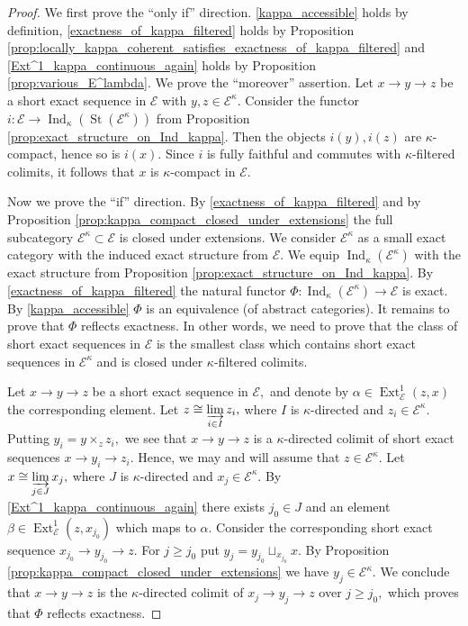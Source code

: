\documentclass[11pt,leqno]{amsart}
\numberwithin{equation}{section}
\newcommand{\indlim}[1][]{\mathop{\varinjlim}\limits_{#1}}
\newcommand{\St}{\operatorname{St}}
\newcommand{\cE}{{\mathcal E}}
\newcommand{\Ext}{\operatorname{Ext}}
\newcommand{\Ind}{\operatorname{Ind}}
\begin{document}
\begin{proof}
	We first prove the ``only if'' direction. \ref{kappa_accessible} holds by definition, \ref{exactness_of_kappa_filtered} holds by Proposition \ref{prop:locally_kappa_coherent_satisfies_exactness_of_kappa_filtered} and \ref{Ext^1_kappa_continuous_again} holds by Proposition \ref{prop:various_E^lambda}. We prove the ``moreover'' assertion. Let $x\to y\to z$ be a short exact sequence in $\cE$ with $y,z\in\cE^{\kappa}.$ Consider the functor $i:\cE\to\Ind_{\kappa}(\St(\cE^{\kappa}))$ from Proposition \ref{prop:exact_structure_on_Ind_kappa}. Then the objects $i(y),i(z)$ are $\kappa$-compact, hence so is $i(x).$ Since $i$ is fully faithful and commutes with $\kappa$-filtered colimits, it follows that $x$ is $\kappa$-compact in $\cE.$
	
	Now we prove the ``if'' direction. By \ref{exactness_of_kappa_filtered} and by Proposition \ref{prop:kappa_compact_closed_under_extensions} the full subcategory $\cE^{\kappa}\subset\cE$ is closed under extensions. We consider $\cE^{\kappa}$ as a small exact category with the induced exact structure from $\cE.$ We equip $\Ind_{\kappa}(\cE^{\kappa})$ with the exact structure from Proposition \ref{prop:exact_structure_on_Ind_kappa}. By \ref{exactness_of_kappa_filtered} the natural functor $\Phi:\Ind_{\kappa}(\cE^{\kappa})\to\cE$ is exact. By \ref{kappa_accessible} $\Phi$ is an equivalence (of abstract categories). It remains to prove that $\Phi$ reflects exactness. In other words, we need to prove that the class of short exact sequences in $\cE$ is the smallest class which contains short exact sequences in $\cE^{\kappa}$ and is closed under $\kappa$-filtered colimits.
	
	Let $x\to y\to z$ be a short exact sequence in $\cE,$ and denote by $\alpha\in\Ext^1_{\cE}(z,x)$ the corresponding element. Let $z\cong\indlim[i\in I]z_i,$ where $I$ is $\kappa$-directed and $z_i\in\cE^{\kappa}.$ Putting $y_i = y\times_z z_i,$ we see that $x\to y\to z$ is a $\kappa$-directed colimit of short exact sequences $x\to y_i\to z_i.$ Hence, we may and will assume that $z\in \cE^{\kappa}.$ Let $x\cong \indlim[j\in J]x_j,$ where $J$ is $\kappa$-directed and $x_j\in\cE^{\kappa}.$ By \ref{Ext^1_kappa_continuous_again} there exists $j_0\in J$ and an element $\beta\in\Ext^1_{\cE}(z,x_{j_0})$ which maps to $\alpha.$ Consider the corresponding short exact sequence $x_{j_0}\to y_{j_0}\to z.$ For $j\geq j_0$ put $y_j = y_{j_0}\sqcup_{x_{j_0}} x.$ By Proposition \ref{prop:kappa_compact_closed_under_extensions} we have $y_j\in\cE^{\kappa}.$ We conclude that $x\to y\to z$ is the $\kappa$-directed colimit of $x_j\to y_j\to z$ over $j\geq j_0,$ which proves that $\Phi$ reflects exactness.   
\end{proof}
\end{document}
